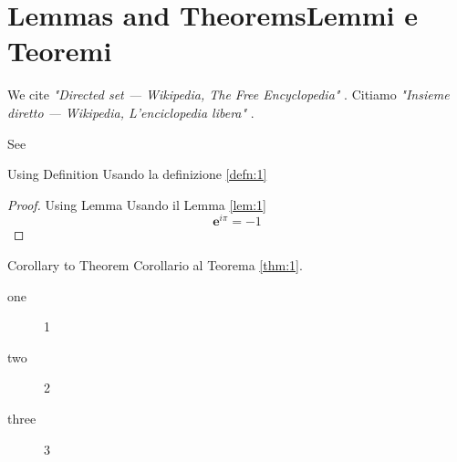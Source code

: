 \section[L and T]{\ifCDLeng Lemmas and Theorems\fi\ifCDLita Lemmi e Teoremi\fi}

\CDLeng We cite \emph{"Directed set --- {Wikipedia}{,} The Free Encyclopedia"} \cite{enwiki:1103032969}.
\CDLita Citiamo \emph{"Insieme diretto --- Wikipedia{,} L'enciclopedia libera"} \cite{itwiki:102088385}.

\begin{Lem}[Cauchy]\label{lem:1}
  \lipsum[3]

  See \cite{wiki:it:tautol}
\end{Lem}

\begin{Theorem}\label{thm:1}
  \CDLeng Using Definition
  \CDLita Usando la definizione
  \ref{defn:1} \\
  \lipsum[4]
  \begin{proof}
    \CDLeng Using Lemma
    \CDLita Usando il Lemma
    \ref{lem:1}
    \begin{equation}
      \label{eq:1}
      {\mathbf{e}}^{i \pi }=-1
    \end{equation}
  \end{proof}
\end{Theorem}


\begin{Cor}\label{cor:1}
  \CDLeng Corollary to Theorem
  \CDLita Corollario al Teorema
  \ref{thm:1}.
  \\
  \lipsum[6]
\end{Cor}

\begin{description}
\item[one] 1
\item[two] 2 %
\item[three] 3
\end{description}


